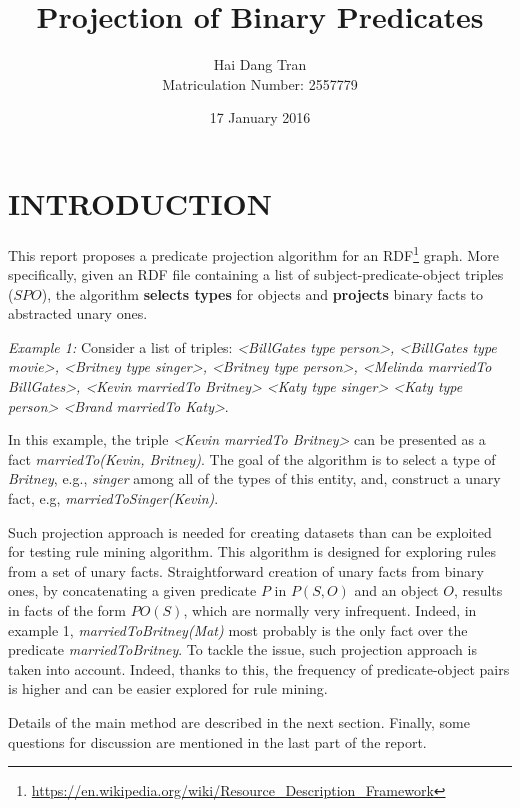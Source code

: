 \documentclass{acm_proc_article-sp}
\begin{document}
\title{Projection of Binary Predicates}
\author{
\alignauthor
Hai Dang Tran\\Matriculation Number: 2557779
}
\date{17 January 2016}

\maketitle

\section{INTRODUCTION}
This report proposes a predicate projection algorithm for an RDF\footnote{\url{https://en.wikipedia.org/wiki/Resource_Description_Framework}} graph. More specifically, given an RDF file containing a list of subject-predicate-object triples ($SPO$), the algorithm \textbf{selects types} for objects and \textbf{projects} binary facts to abstracted unary ones.

\textit{Example 1:} Consider a list of triples: \textit{<BillGates type person>, <BillGates type movie>, <Britney type singer>, <Britney type person>, <Melinda marriedTo BillGates>, <Kevin marriedTo Britney> <Katy type singer> <Katy type person> <Brand marriedTo Katy>}.

In this example, the triple \textit{<Kevin marriedTo Britney>} can be presented as a fact \textit{marriedTo(Kevin, Britney)}. The goal of the algorithm is to select a type of \textit{Britney}, e.g., \textit{singer} among all of the types of this entity, and, construct a unary fact, e.g, \textit{marriedToSinger(Kevin)}.

Such projection approach is needed for creating datasets than can be exploited for testing rule mining algorithm. This algorithm is designed for exploring rules from a set of unary facts. Straightforward creation of unary facts from binary ones, by concatenating a given predicate $P$ in $P(S, O)$ and an object $O$, results in facts of the form $PO(S)$, which are normally very infrequent. Indeed, in example 1, \textit{marriedToBritney(Mat)} most probably is the only fact over the predicate \textit{marriedToBritney}. To tackle the issue, such projection approach is taken into account. Indeed, thanks to this, the frequency of predicate-object pairs is higher and can be easier explored for rule mining.

Details of the main method are described in the next section. Finally, some questions for discussion are mentioned in the last part of the report.
\end{document}
